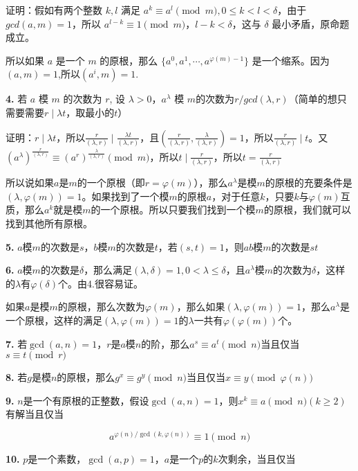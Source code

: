 \documentclass{article}
\begin{document}
证明：假如有两个整数 $k, l$ 满足 $a^k\equiv a^l\pmod m,0\le k < l < \delta$，由于 $gcd(a,m)=1$，所以 $a^{l-k}\equiv 1\pmod m$，$l-k<\delta$，这与 $\delta$ 最小矛盾，原命题成立。

所以如果 $a$ 是一个 $m$ 的原根，那么 $\{a^0,a^1,\cdots,a^{\varphi(m)-1}\}$ 是一个缩系。因为$(a,m)=1$,所以$(a^i,m)=1$.

\textbf{4.} 若 $a$ 模 $m$ 的次数为 $r$, 设 $\lambda >0$，$a^{\lambda}$ 模 $m$的次数为$r/gcd(\lambda,r)$（简单的想只需要需要$r\mid \lambda t$，取最小的$t$）

证明：$r\mid \lambda t$，所以$\frac{r}{(\lambda,r)}\mid \frac{\lambda t}{(\lambda,r)}$，且$(\frac{r}{(\lambda,r)},\frac{\lambda}{(\lambda,r)})=1$，所以$\frac{r}{(\lambda,r)}\mid t$。又$(a^{\lambda})^{\frac{r}{(\lambda,r)}}\equiv (a^{r})^{\frac{\lambda}{(\lambda,r)}}\pmod m$，所以$t\mid \frac{r}{(\lambda,r)}$，所以$t=\frac{r}{(\lambda,r)}$

所以说如果$a$是$m$的一个原根（即$r=\varphi(m)$），那么$a^{\lambda}$是模$m$的原根的充要条件是$(\lambda,\varphi(m))=1$。如果找到了一个模$m$的原根$a$，对于任意$k$，只要$k$与$\varphi(m)$互质，那么$a^k$就是模$m$的一个原根。所以只要我们找到一个模$m$的原根，我们就可以找到其他所有原根。

\textbf{5.} $a$模$m$的次数是$s$，$b$模$m$的次数是$t$，若$(s,t)=1$，则$ab$模$m$的次数是$st$

\textbf{6.} $a$模$m$的次数是$\delta$，那么满足$(\lambda,\delta)=1,0<\lambda\le\delta$，且$a^{\lambda}$模$m$的次数为$\delta$，这样的$\lambda$有$\varphi(\delta)$个。由4.很容易证。

如果$a$是模$m$的原根，那么次数为$\varphi(m)$，那么如果$(\lambda,\varphi(m))=1$，那么$a^{\lambda}$是一个原根，这样的满足$(\lambda,\varphi(m))=1$的$\lambda$一共有$\varphi(\varphi(m))$个。

\textbf{7.} 若$\gcd(a,n)=1$，$r$是$a$模$n$的阶，那么$a^s\equiv a^t\pmod{n}$当且仅当$s\equiv t\pmod{r}$

\textbf{8.} 若$g$是模$n$的原根，那么$g^x\equiv g^y\pmod{n}$当且仅当$x\equiv y\pmod{\varphi(n)}$

\textbf{9.} $n$是一个有原根的正整数，假设$\gcd(a,n)=1$，则$x^k\equiv a\pmod{n} (k\ge 2) $有解当且仅当 

\begin{equation}
    a^{\varphi(n)/\gcd(k, \varphi(n))}\equiv 1\pmod{n}
\end{equation}

\textbf{10.} $p$是一个素数，$\gcd(a,p)=1$，$a$是一个$p$的$k$次剩余，当且仅当
\end{document}
